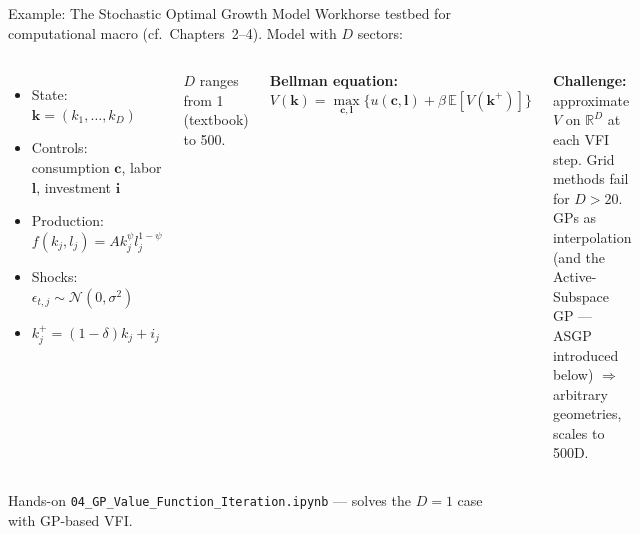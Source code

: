 \documentclass[aspectratio=169,11pt]{beamer}
\newcommand{\emphc}[1]{\textcolor{harvardcrimson}{#1}}
\newcommand{\R}{\mathbb{R}}
\newcommand{\E}[1]{\mathbb{E}\!\left[#1\right]}
\begin{document}
\begin{frame}{Example: The Stochastic Optimal Growth Model}
\small
Workhorse testbed for computational macro (cf.\ Chapters~2--4). Model with $D$ sectors:

\vspace{0.2em}
\begin{columns}[T]
\begin{itemize}\itemsep0pt
    \item State: $\bm{k} = (k_1, \ldots, k_D)$
    \item Controls: consumption $\bm{c}$, labor $\bm{l}$, investment $\bm{i}$
    \item Production: $f(k_j, l_j) = A k_j^\psi l_j^{1-\psi}$
    \item Shocks: $\epsilon_{t,j} \sim \mathcal{N}(0, \sigma^2)$
    \item $k_{j}^+ = (1-\delta) k_j + i_j$
\end{itemize}

\vspace{0.2em}
$D$ ranges from 1 (textbook) to \emphc{500}.

\textbf{Bellman equation:}
\[
V(\bm{k}) = \max_{\bm{c}, \bm{l}} \bigl\{ u(\bm{c}, \bm{l}) + \beta\, \E{V(\bm{k}^+)} \bigr\}
\]

\textbf{Challenge:} approximate $V$ on $\R^D$ at each VFI step. Grid methods fail for $D > 20$. \emphc{GPs as interpolation} (and the \emphc{Active-Subspace GP --- ASGP} introduced below) $\Rightarrow$ arbitrary geometries, scales to 500D.
\end{columns}

\vspace{0.3em}
\begin{block}{Hands-on}
\small \texttt{04\_GP\_Value\_Function\_Iteration.ipynb} --- solves the $D=1$ case with GP-based VFI.
\end{block}
\end{frame}
\end{document}
